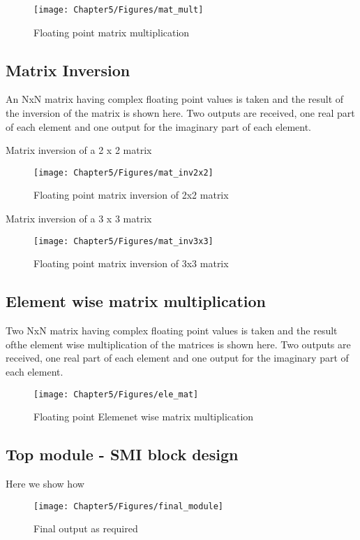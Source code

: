 \begin{figure}[h]
\centering
\texttt{[image: Chapter5/Figures/mat\_mult]}		
\caption{ \label{fig:1} Floating point matrix multiplication}
\end{figure} 

\subsection{Matrix Inversion}
An NxN matrix having complex floating point values is taken and the result of the inversion of the matrix is shown here. Two outputs are received, one real part of each element and one output for the imaginary part of each element.

Matrix inversion of a 2 x 2 matrix
\begin{figure}[h]
\centering
\texttt{[image: Chapter5/Figures/mat\_inv2x2]}		
\caption{ \label{fig:1} Floating point matrix inversion of 2x2 matrix}
\end{figure}

Matrix inversion of a 3 x 3 matrix
\begin{figure}[h]
\centering
\texttt{[image: Chapter5/Figures/mat\_inv3x3]}		
\caption{ \label{fig:1} Floating point matrix inversion of 3x3 matrix}
\end{figure}

\subsection{Element wise matrix multiplication}
Two NxN matrix having complex floating point values is taken and the result ofthe element wise multiplication of the matrices is shown here. Two outputs are received, one real part of each element and one output for the imaginary part of each element.

\begin{figure}[h]
\centering
\texttt{[image: Chapter5/Figures/ele\_mat]}		
\caption{ \label{fig:1} Floating point Elemenet wise matrix multiplication}
\end{figure}

\subsection{Top module - SMI block design}
Here we show how 


\begin{figure}[h]
\centering
\texttt{[image: Chapter5/Figures/final\_module]}		
\caption{ \label{fig:1} Final output as required}
\end{figure}
